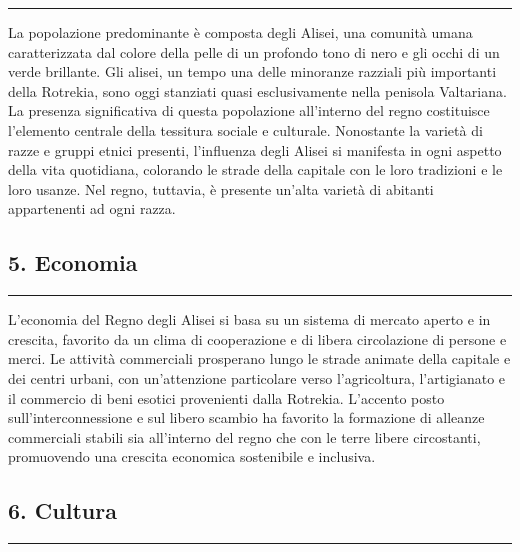 \begin{center}\rule{0.5\linewidth}{0.5pt}\end{center}

La popolazione predominante è composta degli Alisei, una comunità umana
caratterizzata dal colore della pelle di un profondo tono di nero e gli
occhi di un verde brillante. Gli alisei, un tempo una delle minoranze
razziali più importanti della Rotrekia, sono oggi stanziati quasi
esclusivamente nella penisola Valtariana. La presenza significativa di
questa popolazione all'interno del regno costituisce l'elemento centrale
della tessitura sociale e culturale. Nonostante la varietà di razze e
gruppi etnici presenti, l'influenza degli Alisei si manifesta in ogni
aspetto della vita quotidiana, colorando le strade della capitale con le
loro tradizioni e le loro usanze. Nel regno, tuttavia, è presente
un'alta varietà di abitanti appartenenti ad ogni razza.

\subsection{5. Economia}\label{economia}

\begin{center}\rule{0.5\linewidth}{0.5pt}\end{center}

L'economia del Regno degli Alisei si basa su un sistema di mercato
aperto e in crescita, favorito da un clima di cooperazione e di libera
circolazione di persone e merci. Le attività commerciali prosperano
lungo le strade animate della capitale e dei centri urbani, con
un'attenzione particolare verso l'agricoltura, l'artigianato e il
commercio di beni esotici provenienti dalla Rotrekia. L'accento posto
sull'interconnessione e sul libero scambio ha favorito la formazione di
alleanze commerciali stabili sia all'interno del regno che con le terre
libere circostanti, promuovendo una crescita economica sostenibile e
inclusiva.

\subsection{6. Cultura}\label{cultura}

\begin{center}\rule{0.5\linewidth}{0.5pt}\end{center}


